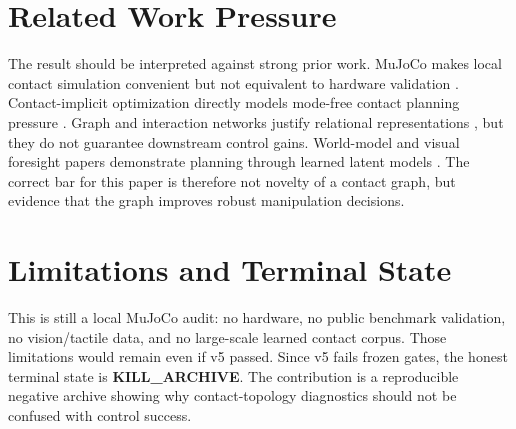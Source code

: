 \documentclass{article}
\begin{document}
\section{Related Work Pressure}
The result should be interpreted against strong prior work. MuJoCo makes local contact simulation convenient but not equivalent to hardware validation \citep{todorov2012mujoco}. Contact-implicit optimization directly models mode-free contact planning pressure \citep{posa2014direct}. Graph and interaction networks justify relational representations \citep{battaglia2016interaction,battaglia2018relational,sanchezgonzalez2020learning}, but they do not guarantee downstream control gains. World-model and visual foresight papers demonstrate planning through learned latent models \citep{ha2018world,hafner2019planet,hafner2020dreamer,ebert2018visual}. The correct bar for this paper is therefore not novelty of a contact graph, but evidence that the graph improves robust manipulation decisions.

\section{Limitations and Terminal State}
This is still a local MuJoCo audit: no hardware, no public benchmark validation, no vision/tactile data, and no large-scale learned contact corpus. Those limitations would remain even if v5 passed. Since v5 fails frozen gates, the honest terminal state is \textbf{KILL\_ARCHIVE}. The contribution is a reproducible negative archive showing why contact-topology diagnostics should not be confused with control success.

\clearpage
\appendix
\end{document}
